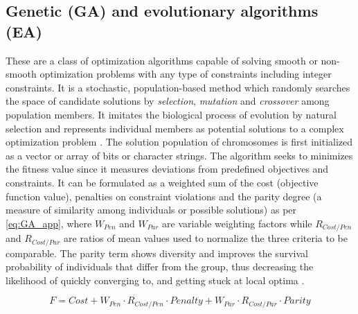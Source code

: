 \documentclass[final,3p,times]{elsarticle}
\begin{document}
\subsection{Genetic (GA) and evolutionary algorithms (EA)}

These are a class of optimization algorithms capable of solving smooth or non-smooth optimization problems with any type of constraints including integer constraints. It is a stochastic, population-based method which randomly searches the space of candidate solutions by \textit{selection}, \textit{mutation} and \textit{crossover} among population members. It imitates the biological process of evolution by natural selection and represents individual members as potential solutions to a complex optimization problem \cite{nemati2015}. The solution population of chromosomes is first initialized as a vector or array of bits or character strings. The algorithm seeks to minimizes the fitness value since it measures deviations from predefined objectives and constraints. It can be formulated as a weighted sum of the cost (objective function value), penalties on constraint violations and the parity degree (a measure of similarity among individuals or possible solutions) as per \cref{eq:GA_app}, where $W_{Pen}$ and $W_{Par}$ are variable weighting factors while $R_{Cost/Pen}$ and $R_{Cost/Par}$ are ratios of mean values used to normalize the three criteria to be comparable. The parity term shows diversity and improves the survival probability of individuals that differ from the group, thus decreasing the likelihood of quickly converging to, and getting stuck at local optima \cite{nemati2015}.

\begin{equation}
    F = Cost + W_{Pen} \cdot R_{Cost/Pen} \cdot Penalty + W_{Par} \cdot R_{Cost/Par} \cdot Parity
    \label{eq:GA_app}
\end{equation}
\end{document}

